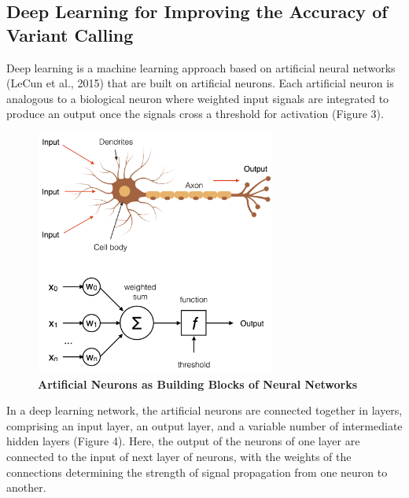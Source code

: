 \documentclass{article}
\begin{document}
\subsection{Deep Learning for Improving the Accuracy of Variant Calling} 
Deep learning is a machine learning approach based on artificial neural networks (LeCun et al., 2015) that are built on artificial neurons. Each artificial neuron is analogous to a biological neuron where weighted input signals are integrated to produce an output once the signals cross a threshold for activation (Figure 3).  
\begin{figure}[H]
\includegraphics[width=0.7\textwidth]{neuron.png}
\centering
\caption{\textbf{Artificial Neurons as Building Blocks of Neural Networks}}
\end{figure}
In a deep learning network, the artificial neurons are connected together in layers, comprising an input layer, an output layer, and a variable number of intermediate hidden layers (Figure 4). Here, the output of the neurons of one layer are connected to the input of next layer of neurons, with the weights of the connections determining the strength of signal propagation from one neuron to another.
\end{document}
